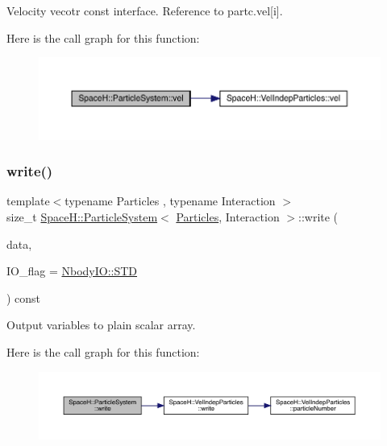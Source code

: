 Velocity vecotr const interface. Reference to partc.\+vel\mbox{[}i\mbox{]}. 

Here is the call graph for this function\+:
\nopagebreak
\begin{figure}[H]
\begin{center}
\leavevmode
\includegraphics[width=350pt]{class_space_h_1_1_particle_system_a5f781e70a7b479b5b8ad427241203dae_cgraph}
\end{center}
\end{figure}
\mbox{\label{class_space_h_1_1_particle_system_af662bb9620680baa12c67f8901c42f90}} 
\subsubsection{\texorpdfstring{write()}{write()}}
{\footnotesize\ttfamily template$<$typename Particles , typename Interaction $>$ \\
size\+\_\+t \mbox{\hyperlink{class_space_h_1_1_particle_system}{Space\+H\+::\+Particle\+System}}$<$ \mbox{\hyperlink{struct_space_h_1_1_particles}{Particles}}, Interaction $>$\+::write (\begin{DoxyParamCaption}\item[{\mbox{\hyperlink{class_space_h_1_1_particle_system_a71f8e04a3c8adc44b2a8b41e0cd55278}{Scalar\+Buffer}} \&}]{data,  }\item[{const \mbox{\hyperlink{namespace_space_h_a296a8bae763a754564bfdce216e31b59}{Nbody\+IO}}}]{I\+O\+\_\+flag = {\ttfamily \mbox{\hyperlink{namespace_space_h_a296a8bae763a754564bfdce216e31b59ac6ce23be5d350ce18a665427d2d950f7}{Nbody\+I\+O\+::\+S\+TD}}} }\end{DoxyParamCaption}) const\hspace{0.3cm}{\ttfamily [inline]}}



Output variables to plain scalar array. 

Here is the call graph for this function\+:
\nopagebreak
\begin{figure}[H]
\begin{center}
\leavevmode
\includegraphics[width=350pt]{class_space_h_1_1_particle_system_af662bb9620680baa12c67f8901c42f90_cgraph}
\end{center}
\end{figure}


